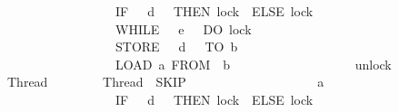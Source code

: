 \begin{isabellebody}
\ \ \ \ \ \ \ \ \ \ \ \ \ \ \ \ \ \ IF\ {\isacharparenleft}{\kern0pt}{\isasymlambda}{\isasymsigma}{\isachardot}{\kern0pt}\ {\isasymsigma}\ {\isacharprime}{\kern0pt}{\isacharprime}{\kern0pt}d{\isacharprime}{\kern0pt}{\isacharprime}{\kern0pt}\ {\isachargreater}{\kern0pt}\ {}{\isacharparenright}{\kern0pt}\ THEN\ lock\ {}\ ELSE\ lock\ {}{\isacharsemicolon}{\kern0pt}\ \ \isanewline
\ \ \ \ \ \ \ \ \ \ \ \ \ \ \ \ \ \ WHILE\ {\isacharparenleft}{\kern0pt}{\isasymlambda}{\isasymsigma}{\isachardot}{\kern0pt}\ {\isasymsigma}\ {\isacharprime}{\kern0pt}{\isacharprime}{\kern0pt}e{\isacharprime}{\kern0pt}{\isacharprime}{\kern0pt}\ {\isachargreater}{\kern0pt}\ {}{\isacharparenright}{\kern0pt}\ DO\ lock\ {}\ {\isacharsemicolon}{\kern0pt}\ \ \isanewline
\ \ \ \ \ \ \ \ \ \ \ \ \ \ \ \ \ \ STORE\ {\isacharparenleft}{\kern0pt}{\isasymlambda}{\isasymsigma}{\isachardot}{\kern0pt}\ {\isasymsigma}\ {\isacharprime}{\kern0pt}{\isacharprime}{\kern0pt}d{\isacharprime}{\kern0pt}{\isacharprime}{\kern0pt}\ {\isacharplus}{\kern0pt}\ {}{\isacharparenright}{\kern0pt}\ TO\ {\isacharprime}{\kern0pt}{\isacharprime}{\kern0pt}b{\isacharprime}{\kern0pt}{\isacharprime}{\kern0pt}{\isacharsemicolon}{\kern0pt}\ \isanewline
\ \ \ \ \ \ \ \ \ \ \ \ \ \ \ \ \ \ LOAD\ {\isacharprime}{\kern0pt}{\isacharprime}{\kern0pt}a{\isacharprime}{\kern0pt}{\isacharprime}{\kern0pt}\ FROM\ \ {\isacharprime}{\kern0pt}{\isacharprime}{\kern0pt}b{\isacharprime}{\kern0pt}{\isacharprime}{\kern0pt}{\isacharsemicolon}{\kern0pt}\ \isanewline
\ \ \ \ \ \ \ \ \ \ \ \ \ \ \ \ \ \ unlock\ {}\isanewline
\ \ \ \ \ \ {\isacartoucheclose}\isanewline
\isanewline
{}\isamarkupfalse%
\ Thread{}\ \isanewline
\ \ \ \ \ \ {\isacartoucheopen}\ Thread{}\ {\isasymequiv}\ SKIP\ {\isacharsemicolon}{\kern0pt}\ \isanewline
\ \ \ \ \ \ \ \ \ \ \ \ \ \ \ \ \ \ {\isacharprime}{\kern0pt}{\isacharprime}{\kern0pt}a{\isacharprime}{\kern0pt}{\isacharprime}{\kern0pt}\ {\isacharcolon}{\kern0pt}{\isacharequal}{\kern0pt}\ \ {\isacharparenleft}{\kern0pt}{\isasymlambda}{\isasymsigma}{\isachardot}{\kern0pt}\ {}\ {\isacharplus}{\kern0pt}\ {}{\isacharparenright}{\kern0pt}{\isacharsemicolon}{\kern0pt}\ \isanewline
\ \ \ \ \ \ \ \ \ \ \ \ \ \ \ \ \ \ IF\ {\isacharparenleft}{\kern0pt}{\isasymlambda}{\isasymsigma}{\isachardot}{\kern0pt}\ {\isasymsigma}\ {\isacharprime}{\kern0pt}{\isacharprime}{\kern0pt}d{\isacharprime}{\kern0pt}{\isacharprime}{\kern0pt}\ {\isachargreater}{\kern0pt}\ {}{\isacharparenright}{\kern0pt}\ THEN\ lock\ {}\ ELSE\ lock\ {}{\isacharsemicolon}{\kern0pt}\ \ \isanewline

\end{isabellebody}
